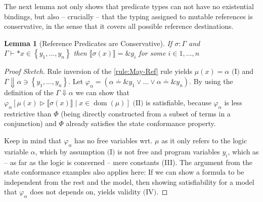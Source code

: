 \documentclass[twoside, english, final]{sdqthesis}
\newcommand{\set}[1]{\left\{ #1 \right\}}
\newcommand{\bbracket}[1]{\llbracket #1 \rrbracket}
\newcommand{\tr}[0]{\triangleright}
\DeclareMathOperator{\dom}{dom}
\newtheorem{lemma}[theorem]{Lemma}
\theoremstyle{definition}
\begin{document}
The next lemma not only shows that predicate types can not have no existential bindings, but also -- crucially -- that the typing assigned to mutable references is conservative, in the sense that it covers all possible reference destinations.
\begin{lemma}[Reference Predicates are Conservative]\label{lem:conservatice-reference-typing}
  If $\sigma : \Gamma $ and $\Gamma \vdash *x \in \set{y_1, \dots, y_n}$ then $\bbracket{\sigma(x)} = \&y_i$ for some $i \in 1, \dots, n$ 
\end{lemma}

\begin{proof}[Proof Sketch]
  Rule inversion of the \cref{rule:May-Ref} rule yields $\mu(x) = \alpha \text{ (I)}$ and $\Gamma\Downarrow \alpha \ni \set{y_1, \dots, y_n}$. 
  Let $\varphi_\alpha = (\alpha \doteq \&y_1 \vee \dots \vee \alpha \doteq \&y_n)$. By using the definition of the $\Gamma\Downarrow \alpha$ we can show that $\varphi_\alpha[\mu(x) \tr \bbracket{\sigma(x)} \mid x \in \dom(\mu)] \text{ (II)}$ is satisfiable, because $\varphi_\alpha$ is less restrictive than $\Phi$ (being directly constructed from a subset of terms in a conjunction) and $\Phi$ already satisfies the state conformance property. 

  Keep in mind that $\varphi_\alpha$ has no free variables wrt. $\mu$ as it only refers to the logic variable $\alpha$, which by assumption $\text{(I)}$ is not free and program variables $y_i$, which as -- as far as the logic is concerned -- mere constants (III). 
  The argument from the state conformance examples also applies here: If we can show a formula to be independent from the rest and the model, then showing satisfiability for a model that $\varphi_\alpha$ does not depends on, yields validity $\text{(IV)}$. 


\end{proof}
\end{document}
